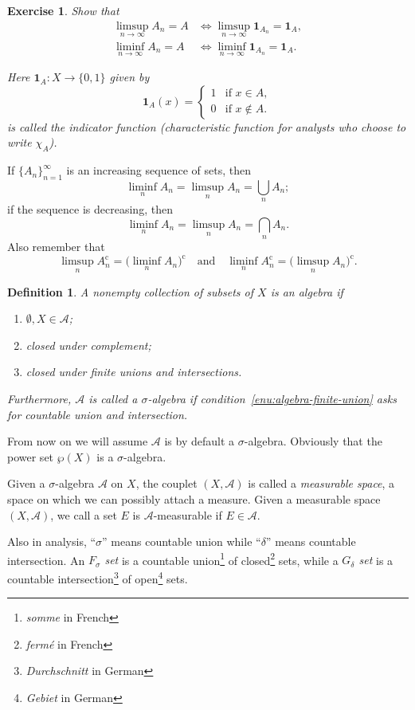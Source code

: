 \documentclass[10pt]{article}
\numberwithin{equation}{section}
\theoremstyle{plain-star}
\theoremstyle{definition-star}
\newtheorem{defn}[equation]{Definition}
\newtheorem{xca}[equation]{Exercise}
\theoremstyle{remark-star}
\theoremstyle{plain-star}
\newcommand{\ind}{\mathbf{1}}
\newcommand{\A}{\mathcal{A}}
\newcommand{\cpl}{\mathrm{c}}
\newcommand{\df}[1]{\textit{#1}}
\begin{document}
\begin{xca}
    Show that \begin{align*}
        \limsup_{n \to \infty}  A_n = A & \iff \limsup_{n \to \infty} \ind_{A_n} = \ind_A, \\
        \liminf_{n \to \infty}  A_n = A & \iff \liminf_{n \to \infty} \ind_{A_n} = \ind_A.
    \end{align*}

    Here $\ind_A\colon X \to \{0,1\}$ given by \[
        \ind_A(x)= \begin{cases}
            1 & \text{if } x \in A, \\
            0 & \text{if } x \not\in A.
        \end{cases}
    \]
    is called the \df{indicator function} (\df{characteristic function} for analysts who choose to write $\chi_A$).
\end{xca}

If $\{A_n\}_{n=1}^\infty$ is an increasing sequence of sets, then \[
    \liminf_n A_n = \limsup_n A_n = \bigcup_n A_n;
\] if the sequence is decreasing, then \[
    \liminf_n A_n = \limsup_n A_n = \bigcap_n A_n.
\] Also remember that \[
    \limsup_n A_n^\cpl = \bigl(\liminf_n A_n\bigr)^\cpl \quad \text{and}\quad 
    \liminf_n A_n^\cpl = \bigl(\limsup_n A_n \bigr)^\cpl.
\]

\begin{defn}
    A nonempty collection of subsets of $X$ is an \df{algebra} if \begin{enumerate}
        \item $\emptyset,X \in \A$;
        \item closed under complement;
        \item \label{enu:algebra-finite-union} closed under finite unions and intersections.
    \end{enumerate}
    Furthermore, $\A$ is called a \df{$\sigma$-algebra} if condition~\ref{enu:algebra-finite-union} asks for countable union and intersection.
\end{defn}

From now on we will assume $\A$ is by default a $\sigma$-algebra. Obviously that the power set $\wp(X)$ is a $\sigma$-algebra.

Given a $\sigma$-algebra $\A$ on $X$, the couplet $(X,\mathcal{A})$ is called a \df{measurable space}, a space on which we can possibly attach a measure. Given a measurable space $(X,\A)$, we call a set $E$ is $\A$-measurable if $E\in \A$.

Also in analysis, ``$\sigma$'' means countable union while ``$\delta$'' means countable intersection. An \df{$F_{\sigma}$ set} is a countable union\footnote{\emph{somme} in French} of closed\footnote{\emph{fermé} in French} sets, while a \df{$G_\delta$ set} is a countable intersection\footnote{\emph{Durchschnitt} in German} of open\footnote{\emph{Gebiet} in German} sets.
\end{document}
